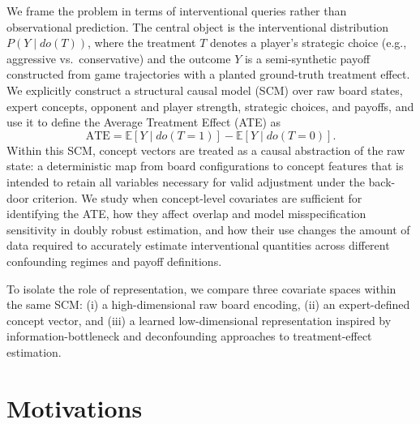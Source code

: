 \documentclass[11pt]{article}
\begin{document}
We frame the problem in terms of interventional queries rather than observational prediction.\cite{pearl2009causality} The central object is the interventional distribution \(P(Y \mid do(T))\), where the treatment \(T\) denotes a player's strategic choice (e.g., aggressive vs.\ conservative) and the outcome \(Y\) is a semi-synthetic payoff constructed from game trajectories with a planted ground-truth treatment effect.\cite{hill2011bayesian} We explicitly construct a structural causal model (SCM) over raw board states, expert concepts, opponent and player strength, strategic choices, and payoffs, and use it to define the Average Treatment Effect (ATE) as
\[
\text{ATE} = \mathbb{E}[Y \mid do(T=1)] - \mathbb{E}[Y \mid do(T=0)].
\]
Within this SCM, concept vectors are treated as a causal abstraction of the raw state: a deterministic map from board configurations to concept features that is intended to retain all variables necessary for valid adjustment under the back-door criterion.\cite{pearl2009causality,scholkopf2021towards} We study when concept-level covariates are sufficient for identifying the ATE, how they affect overlap and model misspecification sensitivity in doubly robust estimation, and how their use changes the amount of data required to accurately estimate interventional quantities across different confounding regimes and payoff definitions.\cite{chernozhukov2018double,kuang2020information,deconfoundingScores}

To isolate the role of representation, we compare three covariate spaces within the same SCM: (i) a high-dimensional raw board encoding, (ii) an expert-defined concept vector, and (iii) a learned low-dimensional representation inspired by information-bottleneck and deconfounding approaches to treatment-effect estimation.\cite{kuang2020information,deconfoundingScores}

\section*{Motivations}
\end{document}
